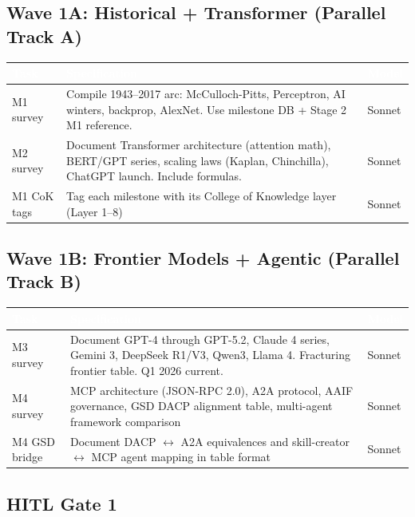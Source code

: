 \documentclass[11pt,letterpaper]{article}
\newcommand{\tableheader}[1]{\textbf{\sffamily\textcolor{white}{#1}}}
\begin{document}
\subsection{Wave 1A: Historical + Transformer (Parallel Track A)}

\begin{center}
\begin{tabularx}{\textwidth}{L{3cm}XC{2cm}}
\toprule
{}
\tableheader{Task} & \tableheader{Specification} & \tableheader{Model} \\
\midrule
M1 survey & Compile 1943--2017 arc: McCulloch-Pitts, Perceptron, AI winters, backprop, AlexNet. Use milestone DB + Stage 2 M1 reference. & Sonnet \\
M2 survey & Document Transformer architecture (attention math), BERT/GPT series, scaling laws (Kaplan, Chinchilla), ChatGPT launch. Include formulas. & Sonnet \\
M1 CoK tags & Tag each milestone with its College of Knowledge layer (Layer 1--8) & Sonnet \\
\bottomrule
\end{tabularx}
\end{center}

\subsection{Wave 1B: Frontier Models + Agentic (Parallel Track B)}

\begin{center}
\begin{tabularx}{\textwidth}{L{3cm}XC{2cm}}
\toprule
{}
\tableheader{Task} & \tableheader{Specification} & \tableheader{Model} \\
\midrule
M3 survey & Document GPT-4 through GPT-5.2, Claude 4 series, Gemini 3, DeepSeek R1/V3, Qwen3, Llama 4. Fracturing frontier table. Q1 2026 current. & Sonnet \\
M4 survey & MCP architecture (JSON-RPC 2.0), A2A protocol, AAIF governance, GSD DACP alignment table, multi-agent framework comparison & Sonnet \\
M4 GSD bridge & Document DACP $\leftrightarrow$ A2A equivalences and skill-creator $\leftrightarrow$ MCP agent mapping in table format & Sonnet \\
\bottomrule
\end{tabularx}
\end{center}

\subsection{HITL Gate 1}
\end{document}
